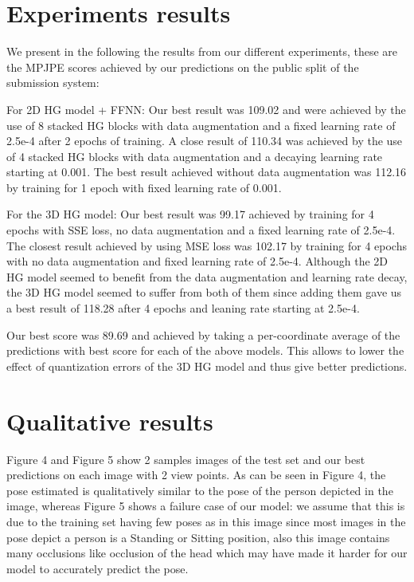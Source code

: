 \documentclass[sigconf]{acmart}
\begin{document}
\section{Experiments results}
We present in the following the results from our different experiments, these are the MPJPE scores achieved by our predictions on the public split of the submission system: 

For 2D HG model + FFNN: Our best result was 109.02 and were achieved by the use of 8 stacked HG blocks with data augmentation and a fixed learning rate of 2.5e-4 after 2 epochs of training. A close result of 110.34 was achieved by the use of 4 stacked HG blocks with data augmentation and a decaying learning rate starting at 0.001. The best result achieved without data augmentation was 112.16 by training for 1 epoch with fixed learning rate of 0.001.

For the 3D HG model: Our best result was 99.17 achieved by training for 4 epochs with SSE loss, no data augmentation and a fixed learning rate of 2.5e-4. The closest result achieved by using MSE loss was 102.17 by training for 4 epochs with no data augmentation and fixed learning rate of 2.5e-4. Although the 2D HG model seemed to benefit from the data augmentation and learning rate decay, the 3D HG model seemed to suffer from both of them since adding them gave us a best result of 118.28 after 4 epochs and leaning rate starting at 2.5e-4.

Our best score was 89.69 and achieved by taking a per-coordinate average of the predictions with best score for each of the above models. This allows to lower the effect of quantization errors of the 3D HG model and thus give better predictions.

\section{Qualitative results}
\quad Figure 4 and Figure 5 show 2 samples images of the test set and our best predictions on each image with 2 view points. As can be seen in Figure 4, the pose estimated is qualitatively similar to the pose of the person depicted in the image, whereas Figure 5 shows a failure case of our model: we assume that this is due to the training set having few poses as in this image since most images in the pose depict a person is a Standing or Sitting position, also this image contains many occlusions like occlusion of the head which may have made it harder for our model to accurately predict the pose.
\end{document}
